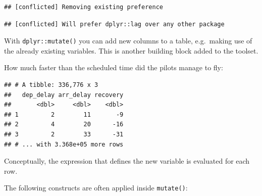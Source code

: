 \documentclass[]{book}
\newenvironment{Shaded}{}{}
\newcommand{\DataTypeTok}[1]{#1}
\newcommand{\KeywordTok}[1]{\textcolor[rgb]{0.00,0.00,1.00}{#1}}
\newcommand{\NormalTok}[1]{#1}
\newcommand{\OperatorTok}[1]{#1}
\newcommand{\StringTok}[1]{\textcolor[rgb]{0.00,0.50,0.50}{#1}}
\begin{document}
\begin{verbatim}
## [conflicted] Removing existing preference
\end{verbatim}

\begin{verbatim}
## [conflicted] Will prefer dplyr::lag over any other package
\end{verbatim}

With \texttt{dplyr::mutate()} you can add new columns to a table, e.g.~making use of the already existing variables.
This is another building block added to the toolset.

How much faster than the scheduled time did the pilots manage to fly:

\begin{Shaded}
\end{Shaded}

\begin{verbatim}
## # A tibble: 336,776 x 3
##   dep_delay arr_delay recovery
##       <dbl>     <dbl>    <dbl>
## 1         2        11       -9
## 2         4        20      -16
## 3         2        33      -31
## # ... with 3.368e+05 more rows
\end{verbatim}

Conceptually, the expression that defines the new variable is evaluated for each row.

The following constructs are often applied inside \texttt{mutate()}:
\end{document}
